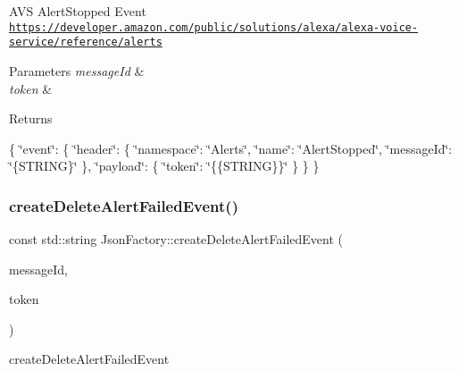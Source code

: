 A\+VS Alert\+Stopped Event \href{https://developer.amazon.com/public/solutions/alexa/alexa-voice-service/reference/alerts}{\tt https\+://developer.\+amazon.\+com/public/solutions/alexa/alexa-\/voice-\/service/reference/alerts} 
\begin{DoxyParams}{Parameters}
{\em message\+Id} & \\
\hline
{\em token} & \\
\hline
\end{DoxyParams}
\begin{DoxyReturn}{Returns}

\end{DoxyReturn}
\{ \char`\"{}event\char`\"{}\+: \{ \char`\"{}header\char`\"{}\+: \{ \char`\"{}namespace\char`\"{}\+: \char`\"{}\+Alerts\char`\"{}, \char`\"{}name\char`\"{}\+: \char`\"{}\+Alert\+Stopped\char`\"{}, \char`\"{}message\+Id\char`\"{}\+: \char`\"{}\{\+S\+T\+R\+I\+N\+G\}\char`\"{} \}, \char`\"{}payload\char`\"{}\+: \{ \char`\"{}token\char`\"{}\+: \char`\"{}\{\{\+S\+T\+R\+I\+N\+G\}\}\char`\"{} \} \} \} \mbox{\label{classAVSJson_1_1JsonFactory_a6c03efa846b5d1cd410405d794ea292f}} 
\subsubsection{\texorpdfstring{create\+Delete\+Alert\+Failed\+Event()}{createDeleteAlertFailedEvent()}}
{\footnotesize\ttfamily const std\+::string Json\+Factory\+::create\+Delete\+Alert\+Failed\+Event (\begin{DoxyParamCaption}\item[{const std\+::string \&}]{message\+Id,  }\item[{const std\+::string \&}]{token }\end{DoxyParamCaption})}



create\+Delete\+Alert\+Failed\+Event 

